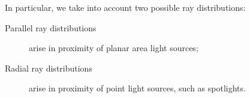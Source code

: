 \documentclass[11pt,a4paper,twocolumn]{article}
\begin{document}
In particular, we take into account two possible ray distributions:
\begin{description}
    \item[Parallel ray distributions] arise in proximity of planar area light sources;
    \item[Radial ray distributions] arise in proximity of point light sources, such as spotlights. 
\end{description}

\begin{figure}[H]
    \centering
\end{figure}
\end{document}
